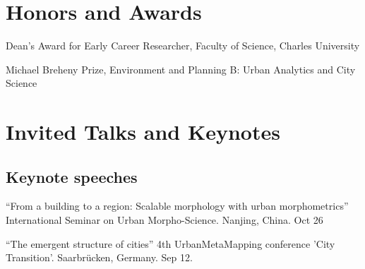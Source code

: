 \documentclass[11pt,a4paper]{report}
\begin{document}
    \section*{Honors and Awards}

    \begin{tablist}

        \item[2024] \tab{}Dean's Award for Early Career Researcher, Faculty of Science, Charles University
        \item[2023] \tab{}Michael Breheny Prize, Environment and Planning B: Urban Analytics and City Science

    \end{tablist}

    \section*{Invited Talks and Keynotes}

    \subsection*{Keynote speeches}

    \begin{tablist}

        \item[2024] \tab{}\enquote{From a building to a region: Scalable morphology with urban morphometrics} International Seminar on Urban Morpho-Science. Nanjing, China. Oct 26
        \item[2024] \tab{}\enquote{The emergent structure of cities} 4th UrbanMetaMapping conference 'City Transition'. Saarbrücken, Germany. Sep 12.

    \end{tablist}


\end{document}
